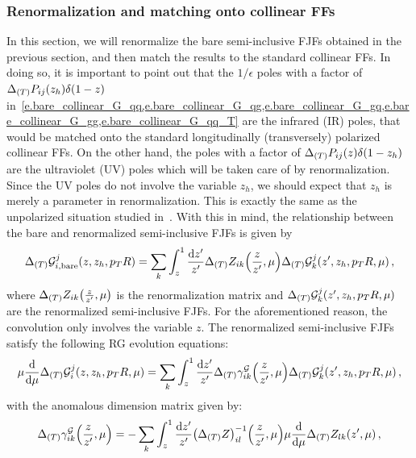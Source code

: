 \documentclass[a4paper, 11 pt]{article}
\begin{document}
\subsubsection{Renormalization and matching onto collinear FFs}
\label{sss.collinear_siFJFs_renormalization}
In this section, we will renormalize the bare semi-inclusive FJFs obtained in the previous section, and then match the results to the standard collinear FFs. In doing so, it is important to point out that the $1 / \epsilon$ poles with a factor of $\Delta _{\pqty{T}} P_{ij} \pqty{z_h} \delta \pqty{1 - z}$ in~\cref{e.bare_collinear_G_qq,e.bare_collinear_G_qg,e.bare_collinear_G_gq,e.bare_collinear_G_gg,e.bare_collinear_G_qq_T} are the infrared (IR) poles, that would be matched onto the standard longitudinally (transversely) polarized collinear FFs. On the other hand, the poles with a factor of $\Delta _{\pqty{T}} P_{ij} \pqty{z} \delta \pqty{1 - z_h}$ are the ultraviolet (UV) poles which will be taken care of by renormalization. Since the UV poles do not involve the variable $z_h$, we should expect that $z_h$ is merely a parameter in renormalization. This is exactly the same as the unpolarized situation studied in~\cite{Kang:2016ehg}. With this in mind, the relationship between the bare and renormalized semi-inclusive FJFs is given by
\begin{equation}
\Delta _{\pqty{T}} \mathcal{G}_{i, \mathrm{bare}}^j \pqty{z, z_h, p_T R}
=
\sum _k \int _z^1 \frac{\dd{z'}}{z'}
\Delta _{\pqty{T}} Z_{ik} \pqty{\frac{z}{z'}, \mu}
\Delta _{\pqty{T}} \mathcal{G} _k^j \pqty{z', z_h, p_T R, \mu}
\, ,
\end{equation}
where $\Delta _{\pqty{T}} Z_{ik} \pqty{\frac{z}{z'}, \mu}$ is the renormalization matrix and $\Delta _{\pqty{T}} \mathcal{G} _k^j \pqty{z', z_h, p_T R, \mu}$ are the renormalized semi-inclusive FJFs. For the aforementioned reason, the convolution only involves the variable $z$.
The renormalized semi-inclusive FJFs satisfy the following RG evolution equations:
\begin{equation}
\mu \frac{\dd{}}{\dd{\mu}}
\Delta _{\pqty{T}} \mathcal{G} _i^j \pqty{z, z_h, p_TR, \mu}
=
\sum _k \int _z^1 \frac{\dd{z'}}{z'}
\Delta _{\pqty{T}}\gamma _{ik}^{ \mathcal{G}} \pqty{\frac{z}{z'}, \mu}
\Delta _{\pqty{T}} \mathcal{G} _k^j \pqty{z', z_h, p_T R, \mu}
\, ,
\end{equation}
with the anomalous dimension matrix given by:
\begin{equation}
\Delta _{\pqty{T}}\gamma _{ik}^{ \mathcal{G}} \pqty{\frac{z}{z'}, \mu}
=
- \sum _k \int _z^1 \frac{\dd{z'}}{z'}
\pqty{\Delta _{\pqty{T}} Z}_{il}^{-1} \pqty{\frac{z}{z'}, \mu}
\mu \frac{\dd{}}{\dd{\mu}} \Delta _{\pqty{T}} Z_{lk} \pqty{z', \mu}
\, ,
\end{equation}
\end{document}

